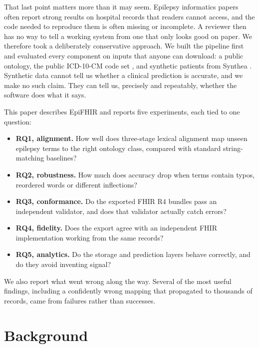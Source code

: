 \documentclass[preprint,12pt]{elsarticle}
\begin{document}
That last point matters more than it may seem. Epilepsy informatics papers often report strong results on hospital records that readers cannot access, and the code needed to reproduce them is often missing or incomplete. A reviewer then has no way to tell a working system from one that only looks good on paper. We therefore took a deliberately conservative approach. We built the pipeline first and evaluated every component on inputs that anyone can download: a public ontology, the public ICD-10-CM code set \cite{icd10cm}, and synthetic patients from Synthea \cite{walonoski2018}. Synthetic data cannot tell us whether a clinical prediction is accurate, and we make no such claim. They can tell us, precisely and repeatably, whether the software does what it says.

This paper describes EpiFHIR and reports five experiments, each tied to one question:
\begin{itemize}
\item \textbf{RQ1, alignment.} How well does three-stage lexical alignment map unseen epilepsy terms to the right ontology class, compared with standard string-matching baselines?
\item \textbf{RQ2, robustness.} How much does accuracy drop when terms contain typos, reordered words or different inflections?
\item \textbf{RQ3, conformance.} Do the exported FHIR R4 bundles pass an independent validator, and does that validator actually catch errors?
\item \textbf{RQ4, fidelity.} Does the export agree with an independent FHIR implementation working from the same records?
\item \textbf{RQ5, analytics.} Do the storage and prediction layers behave correctly, and do they avoid inventing signal?
\end{itemize}

We also report what went wrong along the way. Several of the most useful findings, including a confidently wrong mapping that propagated to thousands of records, came from failures rather than successes.

\section{Background}
\label{sec:background}
\end{document}
